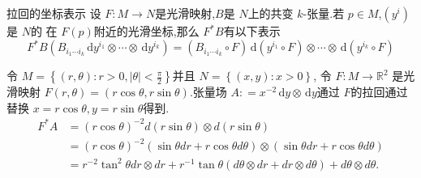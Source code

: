 \documentclass[../../几何与拓扑.tex]{subfiles}
\begin{document}
\begin{corollary}{拉回的坐标表示}
    设 $ F:M\to N $是光滑映射,$ B $是 $ N $上的共变 $ k $-张量.若 $ p \in M $,$ \left( y^{i} \right)  $是 $ N $的 在 $ F\left( p \right)  $附近的光滑坐标,那么 $ F^{*}B $有以下表示 $$
    F^{*}B\left( B_{i_1\cdots i_{k}}\,\mathrm{d} y^{i_1}\otimes \cdots \otimes \,\mathrm{d} y^{i_{k}} \right) 
= \left( B_{i_1\cdots i_{k}}\circ F \right)\,\mathrm{d} \left( y^{i_1}\circ F \right)\otimes \cdots \otimes \,\mathrm{d} \left( y^{i_{k}}\circ F \right)       $$         
\end{corollary}

\begin{example}
    令 $ M = \left\{ \left( r,\theta \right)  : r>0,\left| \theta \right|< \frac{\pi}{2} \right\} $并且 $ N = \left\{ \left( x,y \right):x>0  \right\} $,
    令 $ F:M\to \mathbb{R} ^{2} $   是光滑映射 $ F\left( r,\theta \right)=\left( r\cos \theta,r\sin \theta \right)   $.张量场 $ A: = x^{-2}\,\mathrm{d} y\otimes \,\mathrm{d} y $通过 $ F $的拉回通过替换 $ x = r\cos \theta,y= r\sin \theta $得到. $$
    \begin{aligned}F^*A&=(r\cos\theta)^{-2}d(r\sin\theta)\otimes d(r\sin\theta)\\&=(r\cos\theta)^{-2}(\sin\theta dr+r\cos\theta d\theta)\otimes(\sin\theta dr+r\cos\theta d\theta)\\&=r^{-2}\tan^2\theta dr\otimes dr+r^{-1}\tan\theta(d\theta\otimes dr+dr\otimes d\theta)+d\theta\otimes d\theta.\end{aligned}
    $$    
\end{example}
\end{document}
